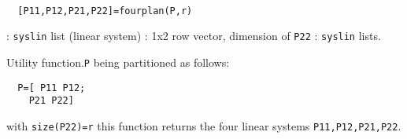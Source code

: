 \begin{mandesc}
   \\ %
\end{mandesc}
\begin{calling_sequence}
\begin{verbatim}
  [P11,P12,P21,P22]=fourplan(P,r)  
\end{verbatim}
\end{calling_sequence}
\begin{parameters}
  \begin{varlist}
    : \verb!syslin! list (linear system)
    : 1x2 row vector, dimension of \verb!P22!
    : \verb!syslin! lists.
  \end{varlist}
\end{parameters}
\begin{mandescription}
  Utility function.\verb!P! being partitioned as follows:
\begin{verbatim}
  P=[ P11 P12;
    P21 P22]  
\end{verbatim}
with \verb!size(P22)=r! this function returns the four linear systems \verb!P11,P12,P21,P22!.
\end{mandescription}
\begin{manseealso}
        
\end{manseealso}
